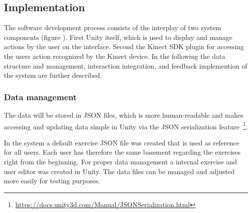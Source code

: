 
\subsection{Implementation }
The software development process consists of the interplay of two system components (figure ). First Unity itself, which is used to display and manage actions by the user on the interface. Second the Kinect SDK plugin for accessing the users action recognized by the Kinect device. In the following the data structure and management, interaction integration, and feedback implemention of the system are further described.

\subsubsection{Data management}
The data will be stored in JSON files, which is more human-readable and makes accessing and updating data simple in Unity via the JSON serialization feature~\footnote{\url{https://docs.unity3d.com/Manual/JSONSerialization.html}}. 



In the system a default exercise JSON file was created that is used as reference for all users. Each user has therefore the same basement regarding the exercises right from the beginning. For proper data management a internal exercise and user editor was created in Unity. The data files can be managed and adjusted more easily for testing purposes.

